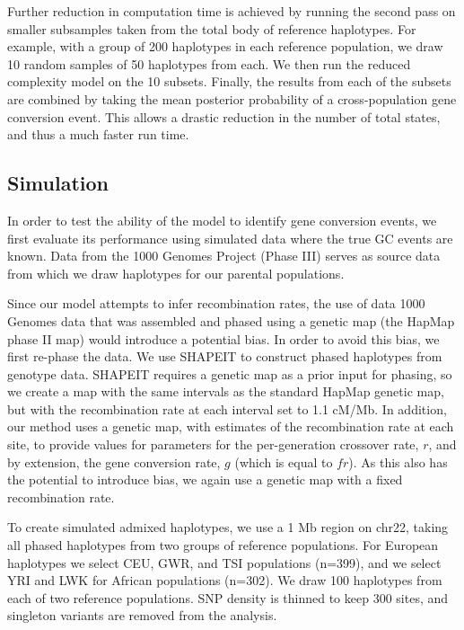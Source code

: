 Further reduction in computation time is achieved by running the second pass on smaller subsamples taken from the total body of reference haplotypes.
For example, with a group of 200 haplotypes in each reference population, we draw 10 random samples of 50 haplotypes from each.
We then run the reduced complexity model on the 10 subsets.
Finally, the results from each of the subsets are combined by taking the mean posterior probability of a cross-population gene conversion event.
This allows a drastic reduction in the number of total states, and thus a much faster run time.


\subsection{Simulation}
In order to test the ability of the model to identify gene conversion events, we first evaluate its performance using simulated data where the true GC events are known.
Data from the 1000 Genomes Project (Phase III\cite{1000G2015}) serves as source data from which we draw haplotypes for our parental populations.

Since our model attempts to infer recombination rates, the use of data 1000 Genomes data that was assembled and phased using a genetic map (the HapMap phase II map\cite{hapmap2007}) would introduce a potential bias.
In order to avoid this bias, we first re-phase the data.
We use SHAPEIT\cite{Delaneau2013} to construct phased haplotypes from genotype data.
SHAPEIT requires a genetic map as a prior input for phasing, so we create a map with the same intervals as the standard HapMap genetic map, but with the recombination rate at each interval set to 1.1 cM/Mb.
In addition, our method uses a genetic map, with estimates of the recombination rate at each site, to provide values for parameters for the per-generation crossover rate, $r$, and by extension, the gene conversion rate, $g$ (which is equal to $f r$).
As this also has the potential to introduce bias, we again use a genetic map with a fixed recombination rate.

To create simulated admixed haplotypes, we use a 1 Mb region on chr22, taking all phased haplotypes from two groups of reference populations.
For European haplotypes we select CEU, GWR, and TSI populations (n=399), and we select YRI and LWK for African populations (n=302).
We draw 100 haplotypes from each of two reference populations.
SNP density is thinned to keep 300 sites, and singleton variants are removed from the analysis.

